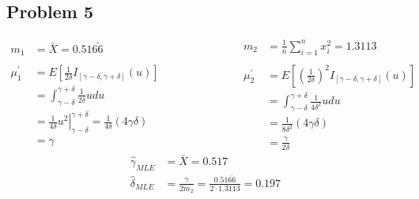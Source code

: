 \documentclass{article}
\begin{document}
\subsection*{Problem 5}
\begin{equation*}
\begin{split}
m_1 &= \bar{X} = 0.51\bar{66} \\ \\
\mu_1^\prime &= E\left[\frac{1}{2\delta}I_{[\gamma-\delta, \gamma+\delta]}(u)\right] \\ 
&= \int^{\gamma+\delta}_{\gamma-\delta}\frac{1}{2\delta}udu \\
&=\frac{1}{4\delta}\left.u^2\right|^{\gamma+\delta}_{\gamma-\delta} = \frac{1}{4\delta}\left(4\gamma\delta\right)\\
& = \gamma 
\end{split}
\begin{split}\hspace{1in}\end{split}
\begin{split}
m_2 &= \frac{1}{n}\sum^n_{i=1}x_i^2 = 1.3113 \\ \\
\mu_2^\prime &= E\left[\left(\frac{1}{2\delta}\right)^2 I_{[\gamma-\delta, \gamma+\delta]}(u)\right] \\
&= \int^{\gamma+\delta}_{\gamma-\delta}\frac{1}{4\delta^2}udu \\
&= \frac{1}{8\delta^2}\left(4\gamma\delta\right) \\
&= \frac{\gamma}{2\delta}
\end{split}
\end{equation*}
\begin{align*}
\hat{\gamma}_{MLE} & = \bar{X} = 0.517 \\
\hat{\delta}_{MLE} & = \frac{\gamma}{2m_2} = \frac{0.51\bar{66}}{2\cdot1.3113} = 0.197
\end{align*}
\end{document}
